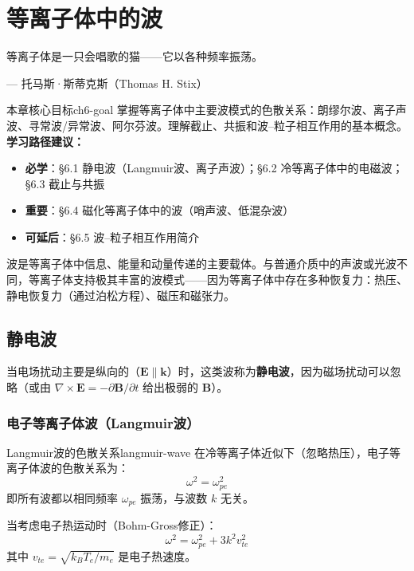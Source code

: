 \documentclass[12pt,a4paper,openany,oneside]{book}
\newcommand{\vect}[1]{\bm{#1}}
\newcommand{\curl}{\nabla\times}
\newcommand{\difficulty}[1]{\marginnote{\textcolor{red}{\textbf{[#1]}}}}
\begin{document}
\chapter{等离子体中的波}
\epigraph{等离子体是一只会唱歌的猫——它以各种频率振荡。}{--- 托马斯·斯蒂克斯（Thomas H. Stix）}

\begin{insight}{本章核心目标}{ch6-goal}
掌握等离子体中主要波模式的色散关系：朗缪尔波、离子声波、寻常波/异常波、阿尔芬波。理解截止、共振和波--粒子相互作用的基本概念。
\tcblower
\textbf{学习路径建议：}

\begin{itemize}[leftmargin=*]
\item[\textcolor{red}{$\blacksquare$}] \textbf{必学}：\S6.1 静电波（Langmuir波、离子声波）；\S6.2 冷等离子体中的电磁波；\S6.3 截止与共振
\item[\textcolor{orange}{$\blacksquare$}] \textbf{重要}：\S6.4 磁化等离子体中的波（哨声波、低混杂波）
\item[\textcolor{green}{$\blacksquare$}] \textbf{可延后}：\S6.5 波--粒子相互作用简介
\end{itemize}
\end{insight}

波是等离子体中信息、能量和动量传递的主要载体。与普通介质中的声波或光波不同，等离子体支持极其丰富的波模式——因为等离子体中存在多种恢复力：热压、静电恢复力（通过泊松方程）、磁压和磁张力。

\section{静电波}\difficulty{基础}

当电场扰动主要是纵向的（$\vect{E}\parallel\vect{k}$）时，这类波称为\textbf{静电波}，因为磁场扰动可以忽略（或由 $\curl\vect{E} = -\partial\vect{B}/\partial t$ 给出极弱的 $\vect{B}$）。

\subsection{电子等离子体波（Langmuir波）}

\begin{theorem}{Langmuir波的色散关系}{langmuir-wave}
在冷等离子体近似下（忽略热压），电子等离子体波的色散关系为：
\[
\omega^2 = \omega_{pe}^2
\]
即所有波都以相同频率 $\omega_{pe}$ 振荡，与波数 $k$ 无关。

当考虑电子热运动时（Bohm-Gross修正）：
\[
\omega^2 = \omega_{pe}^2 + 3k^2 v_{te}^2
\]
其中 $v_{te} = \sqrt{k_B T_e/m_e}$ 是电子热速度。
\end{theorem}
\end{document}
